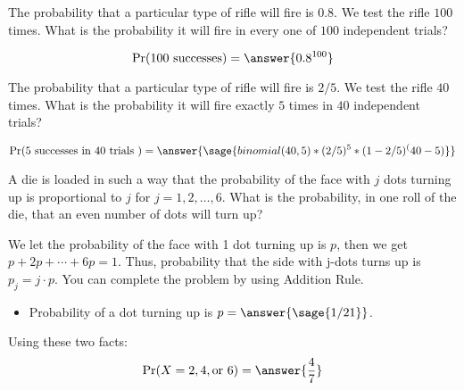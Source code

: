 \documentclass{ximera}
\begin{document}
\hspace{1cm}

\begin{problem}
The probability that a particular type of rifle will fire is $0.8$. We test the rifle $100$ times.
What is the probability it will fire in every one of $100$ independent trials? 

\begin{prompt}
\begin{equation*} 
\Pr(100 \text{ successes} ) = \answer{0.8^{100}}
\end{equation*}
\end{prompt}
\end{problem}


\begin{problem}
The probability that a particular type of rifle will fire is $2/5$. We test the rifle $40$ times.
What is the probability it will fire exactly $5$ times in $40$ independent trials? 

\begin{explanation}
\begin{equation*} 
\Pr(5 \text{ successes in  } 40 \text{ trials } ) = \answer{\sage{binomial(40,5)*(2/5)^5*(1-2/5)^(40-5)}} 
\end{equation*}
\end{explanation}
\end{problem}



\begin{problem}
A die is loaded in such a way that the probability of the face with $j$ dots turning up is proportional to $j$ for $j = 1,2, \ldots,6$. What is the probability, in one roll of the die, that an even number of dots will turn up? 
\begin{hint}
We let the probability of the face with 1 dot turning up is $p$,
then we get $p+2p+\cdots+6p=1$.
Thus, probability that the side with j-dots turns up is $p_j=j\cdot p$.
You can complete the problem by using Addition Rule.
\end{hint}

\begin{prompt}
\begin{itemize}
    \item Probability of a dot turning up is $p=\answer{\sage{1/21}}$.
\end{itemize}
Using these two facts:
\begin{equation*}
\Pr(X=2, 4, \text{or } 6 ) =%
\answer{\frac{4}{7}}
\end{equation*}

\end{prompt}
\end{problem}
\end{document}
